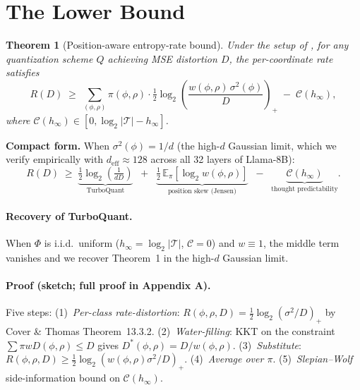\documentclass[11pt]{article}
\newtheorem{theorem}{Theorem}
\theoremstyle{definition}
\newcommand{\E}{\mathbb{E}}
\newcommand{\hinf}{h_\infty}
\begin{document}
\section{The Lower Bound}
\label{sec:bound}

\begin{theorem}[Position-aware entropy-rate bound]
\label{thm:lower-bound}
Under the setup of , for any quantization scheme $Q$ achieving MSE distortion $D$, the per-coordinate rate satisfies
\begin{equation}
R(D) \;\ge\; \sum_{(\phi, \rho)} \pi(\phi, \rho) \cdot \tfrac{1}{2} \log_2\!\left(\frac{w(\phi, \rho) \, \sigma^2(\phi)}{D}\right)_+ \;-\; \mathcal{C}(\hinf),
\end{equation}
where $\mathcal{C}(\hinf) \in [0, \log_2|\mathcal{T}| - \hinf]$.
\end{theorem}

\noindent\textbf{Compact form.} When $\sigma^2(\phi) = 1/d$ (the high-$d$ Gaussian limit, which we verify empirically with $d_\text{eff} \approx 128$ across all 32 layers of Llama-8B):
\begin{equation}
\boxed{\quad R(D) \;\ge\; \underbrace{\tfrac{1}{2}\log_2\!\left(\tfrac{1}{dD}\right)}_{\text{TurboQuant}} \;\;+\;\; \underbrace{\tfrac{1}{2}\,\E_\pi[\log_2 w(\phi,\rho)]}_{\text{position skew (Jensen)}} \;\;-\;\; \underbrace{\mathcal{C}(\hinf)}_{\text{thought predictability}}. \quad}
\end{equation}

\paragraph{Recovery of TurboQuant.}
When $\Phi$ is i.i.d.\ uniform ($\hinf = \log_2|\mathcal{T}|$, $\mathcal{C}=0$) and $w \equiv 1$, the middle term vanishes and we recover \citet{turboquant} Theorem~1 in the high-$d$ Gaussian limit.

\paragraph{Proof (sketch; full proof in Appendix A).}
Five steps:
(1)~\emph{Per-class rate-distortion}: $R(\phi, \rho, D) = \tfrac{1}{2}\log_2(\sigma^2/D)_+$ by Cover \& Thomas Theorem~13.3.2.
(2)~\emph{Water-filling}: KKT on the constraint $\sum \pi w D(\phi, \rho) \le D$ gives $D^*(\phi, \rho) = D / w(\phi, \rho)$.
(3)~\emph{Substitute}: $R(\phi, \rho, D) \ge \tfrac{1}{2}\log_2(w(\phi,\rho)\sigma^2/D)_+$.
(4)~\emph{Average over $\pi$}.
(5)~\emph{Slepian--Wolf} side-information bound on $\mathcal{C}(\hinf)$.
\end{document}
